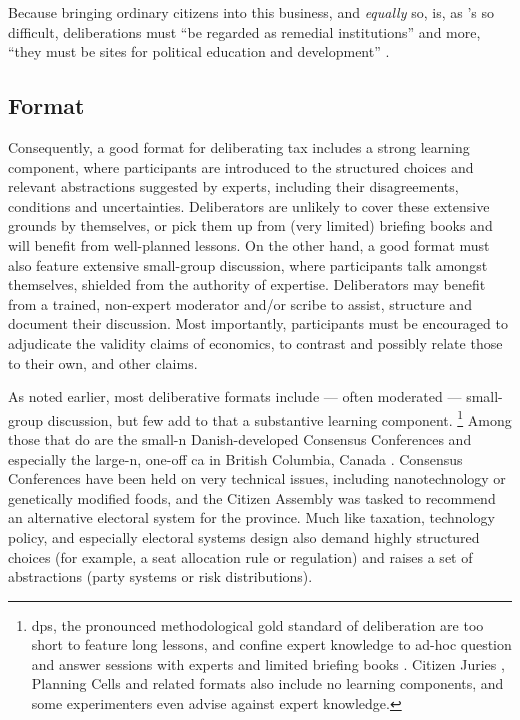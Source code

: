 Because bringing ordinary citizens into this business, and \emph{equally} so, is, as \citeauthor{Rosenberg-2002-aa}'s so difficult, deliberations must ``be regarded as remedial institutions'' \citeyearpar[12]{Rosenberg-2007-aa} and more, ``they must be sites for political education and development'' \citeyearpar[13]{Rosenberg-2007-aa}.

\subsection{Format}
Consequently, a good format for deliberating tax includes a strong learning component, where participants are introduced to the structured choices and relevant abstractions suggested by experts, including their disagreements, conditions and uncertainties.
Deliberators are unlikely to cover these extensive grounds by themselves, or pick them up from (very limited) briefing books and will benefit from well-planned lessons.
On the other hand, a good format must also feature extensive small-group discussion, where participants talk amongst themselves, shielded from the authority of expertise.
Deliberators may benefit from a trained, non-expert moderator and/or scribe to assist, structure and document their discussion.
Most importantly, participants must be encouraged to adjudicate the validity claims of economics, to contrast and possibly relate those to their own, and other claims.

As noted earlier, most deliberative formats include --- often moderated --- small-group discussion, but few add to that a substantive learning component.
\footnote{
	\glspl{dp}, the pronounced methodological gold standard of deliberation \citep{Mansbridge2010} are too short to feature long lessons, and confine expert knowledge to ad-hoc question and answer sessions with experts and limited briefing books \citep{Fishkin2009}.
	Citizen Juries \citep{SmithWales-2000-aa}, Planning Cells \citep{Dienel-1999-aa} and related formats also include no learning components, and some experimenters even advise against expert knowledge.
}
Among those that do are the small-n Danish-developed Consensus Conferences \citep{Grundahl1995} and especially the large-n, one-off \gls{ca} in British Columbia, Canada \citep{Citizen-2004-aa}.
Consensus Conferences have been held on very technical issues, including nanotechnology \citep{LeeKleinman2007} or genetically modified foods, and the Citizen Assembly was tasked to recommend an alternative electoral system for the province.
Much like taxation, technology policy, and especially electoral systems design also demand highly structured choices  (for example, a seat allocation rule or regulation) and raises a set of abstractions (party systems or risk distributions).

